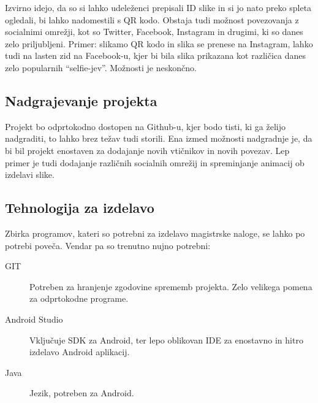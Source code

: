 Izvirno idejo, da so si lahko udeleženci prepisali ID slike in si jo nato preko spleta ogledali, bi lahko nadomestili s QR kodo. Obstaja tudi možnost povezovanja z socialnimi omrežji, kot so Twitter, Facebook, Instagram in drugimi, ki so danes zelo priljubljeni. Primer: slikamo QR kodo in slika se prenese na Instagram, lahko tudi na lasten zid na Facebook-u, kjer bi bila slika prikazana kot različica danes zelo popularnih ``selfie-jev''. Možnosti je neskončno.


\subsection{Nadgrajevanje projekta}
Projekt bo odprtokodno dostopen na Github-u, kjer bodo tisti, ki ga želijo nadgraditi, to lahko brez težav tudi storili. Ena izmed možnosti nadgradnje je, da bi bil projekt enostaven za dodajanje novih vtičnikov in novih povezav. Lep primer je tudi dodajanje različnih socialnih omrežij in spreminjanje animacij ob izdelavi slike.


\subsection{Tehnologija za izdelavo}
Zbirka programov, kateri so potrebni za izdelavo magistrske naloge, se lahko po potrebi poveča. Vendar pa so trenutno nujno potrebni:
\begin{description}
\item[GIT] Potreben za hranjenje zgodovine sprememb projekta. Zelo velikega pomena za odprtokodne programe. 
\item[Android Studio] Vključuje SDK za Android, ter lepo oblikovan IDE za enostavno in hitro izdelavo Android aplikacij.
\item[Java] Jezik, potreben za Android.
\end{description}